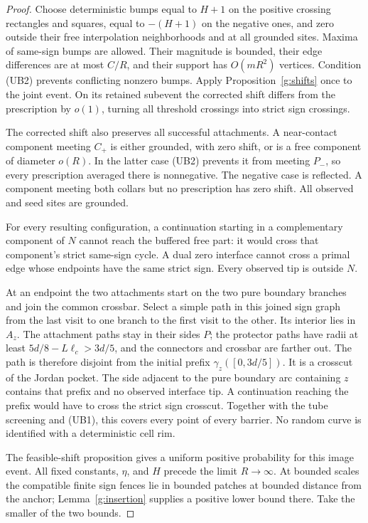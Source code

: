 \begin{proof}
Choose deterministic bumps equal to \(H+1\) on the positive crossing
rectangles and squares, equal to \(-(H+1)\) on the negative ones,
and zero outside their free interpolation neighborhoods and at all
grounded sites.  Maxima of same-sign bumps are allowed.  Their magnitude
is bounded, their edge differences are at most \(C/R\), and their
support has \(O(mR^2)\) vertices.  Condition (UB2) prevents conflicting
nonzero bumps.  Apply Proposition~\ref{g:shifts} once to the joint event.
On its retained subevent the corrected shift differs from the
prescription by \(o(1)\), turning all threshold crossings into strict
sign crossings.

The corrected shift also preserves all successful attachments.  A
near-contact component meeting \(C_+\) is either grounded, with zero
shift, or is a free component of diameter \(o(R)\).  In the latter
case (UB2) prevents it from meeting \(P_-\), so every prescription
averaged there is nonnegative.  The negative case is reflected.
A component meeting both collars but no prescription has zero shift.
All observed and seed sites are grounded.

For every resulting configuration, a continuation starting in a
complementary component of \(N\) cannot reach the buffered free part:
it would cross that component's strict same-sign cycle.  A dual zero
interface cannot cross a primal edge whose endpoints have the same
strict sign.  Every observed tip is outside \(N\).

At an endpoint the two attachments start on the two pure boundary
branches and join the common crossbar.  Select a simple path in this
joined sign graph from the last visit to one branch to the first visit
to the other.  Its interior lies in \(A_z\).  The attachment paths
stay in their sides \(P\); the protector paths have radii at least
\(5d/8-L\ell_c>3d/5\), and the connectors and crossbar are farther out.
The path is therefore disjoint from the initial prefix
\(\gamma_z([0,3d/5])\).  It is a crosscut of the Jordan pocket.
The side adjacent to the pure boundary arc containing \(z\) contains
that prefix and no observed interface tip.  A continuation reaching
the prefix would have to cross the strict sign crosscut.  Together
with the tube screening and (UB1), this covers every point of every
barrier.  No random curve is identified with a deterministic cell rim.

The feasible-shift proposition gives a uniform positive probability
for this image event.  All fixed constants, \(\eta\), and \(H\) precede
the limit \(R\to\infty\).  At bounded scales the compatible finite
sign fences lie in bounded patches at bounded distance from the anchor;
Lemma~\ref{g:insertion} supplies a positive lower bound there.
Take the smaller of the two bounds.


\end{proof}
